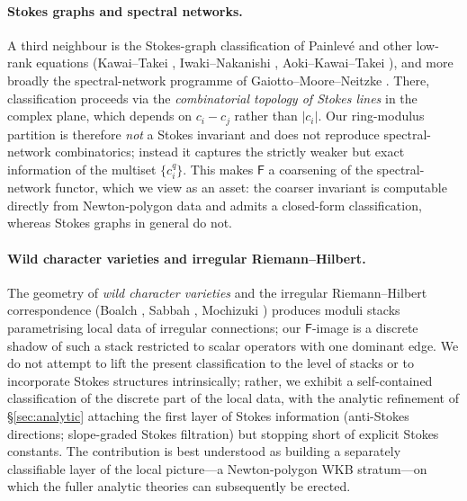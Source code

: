 \documentclass[11pt,a4paper]{article}
\theoremstyle{plain}
\theoremstyle{definition}
\theoremstyle{remark}
\newcommand{\Fclass}{\mathsf{F}}
\begin{document}
\paragraph{Stokes graphs and spectral networks.}
A third neighbour is the Stokes-graph classification of Painlev{\'e} and
other low-rank equations (Kawai--Takei \cite{kawai-takei},
Iwaki--Nakanishi \cite{iwaki-nakanishi}, Aoki--Kawai--Takei
\cite{aoki-kawai-takei}), and more broadly the spectral-network programme
of Gaiotto--Moore--Neitzke \cite{gmn-spectral}. There, classification
proceeds via the \emph{combinatorial topology of Stokes lines} in the
complex plane, which depends on $c_i - c_j$ rather than $|c_i|$. Our
ring-modulus partition is therefore \emph{not} a Stokes invariant and
does not reproduce spectral-network combinatorics; instead it captures
the strictly weaker but exact information of the multiset $\{c_i^q\}$.
This makes $\Fclass$ a coarsening of the spectral-network functor, which
we view as an asset: the coarser invariant is computable directly from
Newton-polygon data and admits a closed-form classification, whereas
Stokes graphs in general do not.

\paragraph{Wild character varieties and irregular Riemann--Hilbert.}
The geometry of \emph{wild character varieties} and the irregular
Riemann--Hilbert correspondence (Boalch
\cite{boalch-stokes,boalch-wildhodge}, Sabbah \cite{sabbah-polarizable},
Mochizuki \cite{mochizuki-asymptotic}) produces moduli stacks parametrising
local data of irregular connections; our $\Fclass$-image is a discrete
shadow of such a stack restricted to scalar operators with one dominant
edge. We do not attempt to lift the present classification to the level
of stacks or to incorporate Stokes structures intrinsically; rather, we
exhibit a self-contained classification of the discrete part of the local
data, with the analytic refinement of \S\ref{sec:analytic} attaching the
first layer of Stokes information (anti-Stokes directions; slope-graded
Stokes filtration) but stopping short of explicit Stokes constants. The
contribution is best understood as building a separately classifiable
layer of the local picture---a Newton-polygon WKB stratum---on which the
fuller analytic theories can subsequently be erected.


\end{document}
